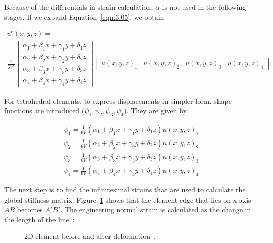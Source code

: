 \noindent Because of the differentials in strain calculation, $\alpha$ is not used in the following stages.
If we expand Equation~\ref{eqn:3.05}, we obtain



\begin{equation}
\begin{array}{l}
u^{e}(x,y,z) = \\
\frac{1}{6V^{e}}
\begin{bmatrix}
\alpha_{1} + \beta_{1}x + \gamma_{1}y + \delta_{1}z \\
\alpha_{2} + \beta_{2}x + \gamma_{2}y + \delta_{2}z \\
\alpha_{3} + \beta_{3}x + \gamma_{3}y + \delta_{3}z \\
\alpha_{4} + \beta_{4}x + \gamma_{4}y + \delta_{4}z
\end{bmatrix}
\begin{bmatrix}
u(x,y,z)_{1} & u(x,y,z)_{2} & u(x,y,z)_{3} & u(x,y,z)_{4}
\end{bmatrix}
\end{array}
\label{eqn:3.06}
\end{equation}

\noindent For tetrahedral elements, to express displacements in simpler form, shape functions are introduced (${\psi}_{1}, {\psi}_{2}, {\psi}_{3}, {\psi}_{4}$). They are given by

\begin{equation}
\begin{array}{l}
{\psi}_{1} =  \frac{1}{6V}\left(\alpha_{1} + \beta_{1}x + \gamma_{1}y + \delta_{1}z\right)u(x,y,z)_{1} \\
{\psi}_{2} =  \frac{1}{6V}\left(\alpha_{2} + \beta_{2}x + \gamma_{2}y + \delta_{2}z\right)u(x,y,z)_{2} \\
{\psi}_{3} =  \frac{1}{6V}\left(\alpha_{3} + \beta_{3}x + \gamma_{3}y + \delta_{3}z\right)u(x,y,z)_{3} \\
{\psi}_{4} =  \frac{1}{6V}\left(\alpha_{4} + \beta_{4}x + \gamma_{4}y + \delta_{4}z\right)u(x,y,z)_{4}
\end{array}
\label{eqn:3.4}
\end{equation}

The next step is to find the infinitesimal strains that are used to calculate the global stiffness matrix. Figure~\ref{fig:deformation2d} shows that the element edge that lies on x-axis $AB$ becomes $A'B'$. The engineering normal strain is calculated as the change in the length of the line~\cite{Logan07}:

\begin{figure}[h]
\centerline{}
\caption{2D element before and after deformation~\cite{Logan07}.}
\label{fig:deformation2d}
\end{figure}

